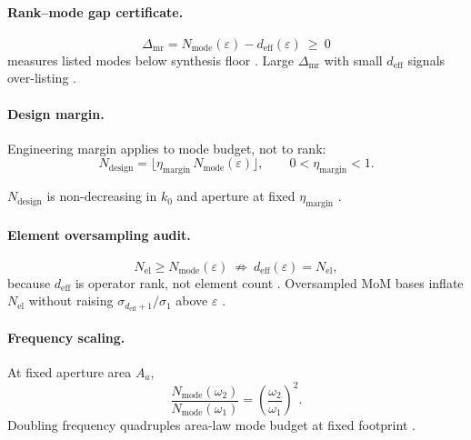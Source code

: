 \paragraph{Rank--mode gap certificate.}
\begin{equation}
\label{eq:ch4.mode-rank-gap}
\Delta_{\mathrm{mr}}=N_{\mathrm{mode}}(\varepsilon)-d_{\mathrm{eff}}(\varepsilon)\ \ge\ 0
\end{equation}
measures listed modes below synthesis floor \cite{devaney2004,hansen1988}. Large \(\Delta_{\mathrm{mr}}\) with small \(d_{\mathrm{eff}}\) signals over-listing
\cite{stratton1941,harrington2001}.

\paragraph{Design margin.}
Engineering margin applies to mode budget, not to rank:
\begin{equation}
\label{eq:ch4.mode-count-margin}
N_{\mathrm{design}}=\lfloor\eta_{\mathrm{margin}}\,N_{\mathrm{mode}}(\varepsilon)\rfloor,\qquad 0<\eta_{\mathrm{margin}}<1.
\end{equation}
\begin{proposition}
\label{prop:ch4.mode-margin-monotone}
\(N_{\mathrm{design}}\) is non-decreasing in \(k_{0}\) and aperture at fixed \(\eta_{\mathrm{margin}}\) \cite{stratton1941,jackson1999,hansen1988,harrington2001}.
\end{proposition}

\paragraph{Element oversampling audit.}
\begin{equation}
\label{eq:ch4.element-mode-inequality}
N_{\mathrm{el}}\ge N_{\mathrm{mode}}(\varepsilon)\ \not\Rightarrow\ d_{\mathrm{eff}}(\varepsilon)=N_{\mathrm{el}},
\end{equation}
because \(d_{\mathrm{eff}}\) is operator rank, not element count \cite{collin2001,harrington2001,devaney2004}. Oversampled MoM bases inflate \(N_{\mathrm{el}}\)
without raising \(\sigma_{d_{\mathrm{eff}}+1}/\sigma_{1}\) above \(\varepsilon\) \cite{hansen1988,stratton1941}.

\paragraph{Frequency scaling.}
At fixed aperture area \(A_{a}\),
\begin{equation}
\label{eq:ch4.mode-freq-scaling}
\frac{N_{\mathrm{mode}}(\omega_{2})}{N_{\mathrm{mode}}(\omega_{1})}=\left(\frac{\omega_{2}}{\omega_{1}}\right)^{2}.
\end{equation}
Doubling frequency quadruples area-law mode budget at fixed footprint \cite{jackson1999,hansen1988,collin2001,harrington2001}.

